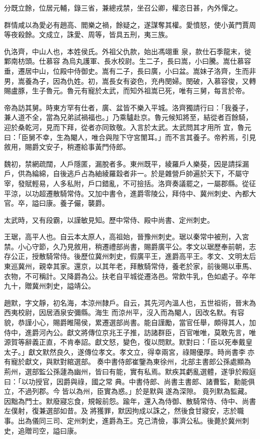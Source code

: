 \begin{pinyinscope}
 分既立餘，位居元輔，錄三省，兼總戎禁，坐召公卿，權恣日甚，內外憚之。



 群情咸以為愛必有趙高、閻樂之禍，餘疑之，遂謀奪其權。愛憤怒，使小黃門賈周等夜殺餘。文成立，誅愛、周等，皆具五刑，夷三族。



 仇洛齊，中山人也，本姓侯氏。外祖父仇款，始出馮翊重
 泉，款仕石季龍末，徙鄴南枋頭。仕慕容為烏丸護軍、長水校尉。生二子，長曰嵩，小曰騰。嵩仕慕容垂，遷居中山，位殿中侍御史。嵩有二子，長曰廣，小曰盆。嵩妹子洛齊，生而非男，嵩養為子，因為仇姓。初，嵩長女有姿色，充冉閔婦。閔破，入慕容俊，又轉賜盧豚，生子魯元。魯元有寵於太武，而知外祖嵩已死，唯有三舅，每言於帝。



 帝為訪其舅。時東方罕有仕者，廣、盆皆不樂入平城。洛齊獨請行曰：「我養子，兼人道不全，當為兄弟試禍福也。」乃乘驢赴京。魯元候知將至，結從者百餘騎，迎於桑乾河，見而下拜，從者亦同致敬。入言於太武。太武問其才用所
 宜，魯元曰：「臣舅不幸，生為閹人，唯合與陛下守宮闈耳。」而不言其養子。帝矜焉，引見敘用，賜爵文安子，稍遷給事黃門侍郎。



 魏初，禁網疏闊，人戶隱匿，漏脫者多。東州既平，綾羅戶人樂葵，因是請採漏戶，供為綸綿，自後逃戶占為紬綾羅縠者非一。於是雜營戶帥遍於天下，不屬守宰，發賦輕易，人多私附，戶口錯亂，不可撿括。洛齊奏議罷之，一屬郡縣。從征平涼，以功超遷散騎常侍。又加中書令，進爵零陵公，拜侍中、冀州刺史、內都大官。卒，謚曰康。養子儼，襲爵。



 太武時，又有段霸，以謹敏見知。歷中常侍、殿中尚書、定州刺史。



 王琚，高平人也。自云本太原人，高祖始，晉豫州刺史。琚以秦常中被刑，入宮禁。小心守節，久乃見敘用，稍遷禮部尚書，賜爵廣平公。孝文以琚歷奉前朝，志存公正，授散騎常侍。後歷位冀州刺史，假廣平王，進爵高平王。孝文、文明太后東巡冀州，親幸其家。還京，以其年老，拜散騎常侍，養老於家，前後賜以車馬、衣物，不可稱計。又降爵為公。扶老自平城從遷洛邑。常飲牛乳，色如處子。卒年九十，贈冀州刺史，謚靖公。



 趙默，字文靜，初名海，本涼州隸戶。自云，其先河內溫人也，五世祖術，晉末為西夷校尉，因居酒泉安彌縣。海生
 而涼州平，沒入而為閹人，因改名默。有容貌，恭謹小心，賜爵睢陽侯，累遷選部尚書。能自謹勵，當官任舉，頗得其人，加侍中，進爵河內公。獻文將傳位京兆王子推，訪諸群臣，百官唯唯，莫敢先言，唯源賀等辭義正直，不肯奉詔。獻文怒，變色，復以問默。默對曰：「臣以死奉戴皇太子。」獻文默然良久，遂傳位孝文。孝文立，得幸兩宮，祿賜優厚。時尚書李亦有寵於獻文，與默對綰選部。奏中書侍郎崔鑒為東徐州，北部主書郎公孫處顯為荊州，選部監公孫蘧為幽州，皆曰有能，實有私焉。默疾其虧亂選體，遂爭於殿庭曰：「以功授官，因爵與祿，國之常
 典。中書侍郎、尚書主書郎、諸曹監，勳能俱立，不過列郡。今皆以為州，臣實為惑。」於是默與遂為深隙。竟列默為監藏。因黜為門士。默廢寢忘食，規報前怨。踰年，還入為侍御、散騎常侍、侍中、尚書左僕射，復兼選部如昔。及將獲罪，默因拘成以誅之，然後食甘寢安，志於職事。出為儀同三司、定州刺史，進爵為王。克己清儉，事濟公私。後薨於冀州刺史，追贈司空，謚曰康。




\end{pinyinscope}
